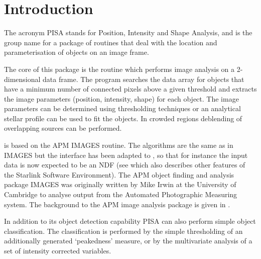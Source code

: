  \newpage
 \begin{latexonly}
   \setlength{\parskip}{0mm}
   \latexonlytoc
   \setlength{\parskip}{\medskipamount}
   \markright{\stardocname}
 \end{latexonly}
\newpage
\renewcommand{\thepage}{\arabic{page}}
\setcounter{page}{1}

\section{Introduction}

The acronym PISA stands for Position, Intensity and Shape Analysis, and
is the group name for a package of routines that deal with the location
and parameterisation of objects on an image frame.

The core of this package is the routine  which performs
image analysis on a 2-dimensional data frame. The program searches the
data array for objects that have a minimum number of connected pixels
above a given threshold and extracts the image parameters (position,
intensity, shape) for each object. The image parameters can be
determined using thresholding techniques or an analytical stellar
profile can be used to fit the objects. In crowded regions deblending
of overlapping sources can be performed.

 is based on the APM IMAGES routine. The algorithms are
the same as in IMAGES but the interface has been adapted to
, so that for
instance the input data is now expected to be an NDF (see
 which also describes other features of the Starlink
Software Environment).  The APM object finding and analysis package
IMAGES was originally written by Mike Irwin at the University of
Cambridge to analyse output from the Automated Photographic Measuring
system. The background to the APM image analysis package is given in
\iref{[2]}.

In addition to its object detection capability PISA can also perform
simple object classification. The classification is performed by the
simple thresholding of an additionally generated `peakedness' measure,
or by the multivariate analysis of a set of intensity corrected
variables.

